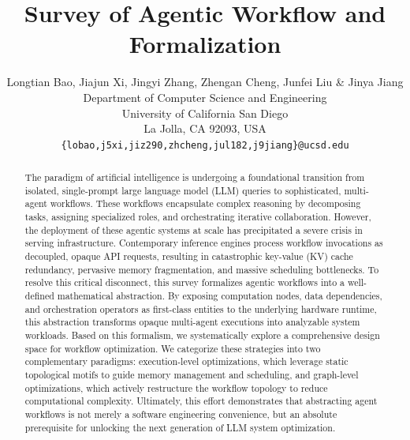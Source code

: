 \documentclass{article} %
\title{Survey of Agentic Workflow and Formalization}
\author{Longtian Bao, Jiajun Xi, Jingyi Zhang, Zhengan Cheng, Junfei Liu \& Jinya Jiang \\
Department of Computer Science and Engineering\\
University of California San Diego\\
La Jolla, CA 92093, USA \\
\texttt{\{lobao,j5xi,jiz290,zhcheng,jul182,j9jiang\}@ucsd.edu} \\
}
\begin{document}
\ifcolmsubmission
\linenumbers
\fi

\maketitle

\begin{abstract}
The paradigm of artificial intelligence is undergoing a foundational transition from isolated, single-prompt large language model (LLM) queries to sophisticated, multi-agent workflows. These workflows encapsulate complex reasoning by decomposing tasks, assigning specialized roles, and orchestrating iterative collaboration. However, the deployment of these agentic systems at scale has precipitated a severe crisis in serving infrastructure. Contemporary inference engines process workflow invocations as decoupled, opaque API requests, resulting in catastrophic key-value (KV) cache redundancy, pervasive memory fragmentation, and massive scheduling bottlenecks. To resolve this critical disconnect, this survey formalizes agentic workflows into a well-defined mathematical abstraction. By exposing computation nodes, data dependencies, and orchestration operators as first-class entities to the underlying hardware runtime, this abstraction transforms opaque multi-agent executions into analyzable system workloads. Based on this formalism, we systematically explore a comprehensive design space for workflow optimization. We categorize these strategies into two complementary paradigms: execution-level optimizations, which leverage static topological motifs to guide memory management and scheduling, and graph-level optimizations, which actively restructure the workflow topology to reduce computational complexity. Ultimately, this effort demonstrates that abstracting agent workflows is not merely a software engineering convenience, but an absolute prerequisite for unlocking the next generation of LLM system optimization.
\end{abstract}







% 




\end{document}
